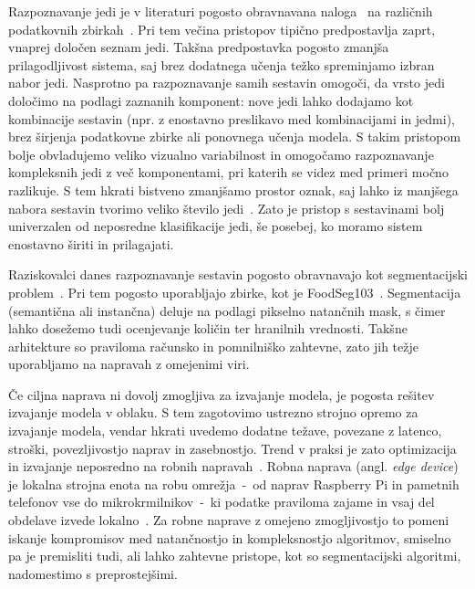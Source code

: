 \documentclass[a4paper,twoside,openright,12pt,slovene]{book}
\begin{document}
    Razpoznavanje jedi je v literaturi pogosto obravnavana
    naloga~\cite{src:vlachopoulou2023food, src:mohanty2022food,
    src:bolanos2017food, src:hassannejad2016food, src:martinel2018wide,
    src:tan2019efficientnet} na različnih podatkovnih
    zbirkah~\cite{src:bossard2014food, src:matsuda2012recognition,
    src:kawano2014automatic, src:chen2016deep}. Pri tem večina pristopov
    tipično predpostavlja zaprt, vnaprej določen seznam jedi. Takšna
    predpostavka pogosto zmanjša prilagodljivost sistema, saj brez
    dodatnega učenja težko spreminjamo izbran nabor jedi. Nasprotno pa
    razpoznavanje samih sestavin omogoči, da vrsto jedi določimo na podlagi
    zaznanih komponent: nove jedi lahko dodajamo kot kombinacije sestavin (npr.
    z enostavno preslikavo med kombinacijami in jedmi), brez širjenja
    podatkovne zbirke ali ponovnega učenja modela. S takim pristopom bolje
    obvladujemo veliko vizualno variabilnost in omogočamo razpoznavanje kompleksnih
    jedi z več komponentami, pri katerih se videz med primeri močno razlikuje. S tem
    hkrati bistveno zmanjšamo prostor oznak, saj lahko iz manjšega nabora
    sestavin tvorimo veliko število jedi~\cite{src:bolanos2017food}. Zato je
    pristop s sestavinami bolj univerzalen od neposredne klasifikacije jedi, še
    posebej, ko moramo sistem enostavno širiti in prilagajati.

    Raziskovalci danes razpoznavanje sestavin pogosto obravnavajo kot segmentacijski problem~\cite{src:wu2021large, src:lan2023foodsam, src:bolanos2016simultaneous, src:pfisterer2019segmentation, src:poply2021refined}. Pri tem pogosto uporabljajo zbirke, kot je FoodSeg103~\cite{src:wu2021large}.
    Segmentacija (semantična ali instančna) deluje na podlagi pikselno natančnih mask, s čimer lahko dosežemo tudi ocenjevanje količin ter hranilnih vrednosti. Takšne arhitekture so praviloma računsko in pomnilniško zahtevne, zato jih težje uporabljamo na napravah z omejenimi viri.

    Če ciljna naprava ni dovolj zmogljiva za izvajanje modela, je
    pogosta rešitev izvajanje modela v oblaku. S tem zagotovimo ustrezno
    strojno opremo za izvajanje modela, vendar hkrati uvedemo dodatne težave,
    povezane z latenco, stroški, povezljivostjo naprav in zasebnostjo. Trend
    v praksi je zato optimizacija in izvajanje neposredno na robnih
    napravah~\cite{src:abadade2023comprehensive}.
    Robna naprava (angl. \emph{edge device}) je lokalna strojna enota na robu
    omrežja~-~od naprav Raspberry Pi in pametnih telefonov vse do
    mikrokrmilnikov~-~ki podatke praviloma zajame in vsaj del obdelave izvede
    lokalno~\cite{src:abadade2023comprehensive,
    src:moosmann2024ultra_tinyissimoyolo, src:boyle2024dsort,
    src:lin2021memory, src:hymel2022edgeimpulse}. Za robne naprave z omejeno
    zmogljivostjo to pomeni iskanje kompromisov med natančnostjo in
    kompleksnostjo algoritmov, smiselno pa je premisliti tudi, ali lahko zahtevne
    pristope, kot so segmentacijski algoritmi, nadomestimo s
    preprostejšimi.
\end{document}
